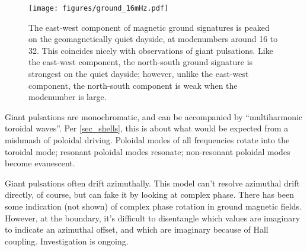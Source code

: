 \begin{figure}[H]
    \centering
    \texttt{[image: figures/ground\_16mHz.pdf]}
    \caption[Dayside Ground Magnetic Fields]{
      The east-west component of magnetic ground signatures is peaked on the geomagnetically quiet dayside, at modenumbers around 16 to 32. This coincides nicely with observations of giant pulsations. Like the east-west component, the north-south ground signature is strongest on the quiet dayside; however, unlike the east-west component, the north-south component is weak when the modenumber is large. 
    }
    \label{fig_ground_signatures}
\end{figure}

Giant pulsations are monochromatic, and can be accompanied by ``multiharmonic toroidal waves''\cite{takahashi_2011}. Per \cref{sec_shells}, this is about what would be expected from a mishmash of poloidal driving. Poloidal modes of all frequencies rotate into the toroidal mode; resonant poloidal modes resonate; non-resonant poloidal modes become evanescent. 

Giant pulsations often drift azimuthally. This model can't resolve azimuthal drift directly, of course, but can fake it by looking at complex phase. There has been some indication (not shown) of complex phase rotation in ground magnetic fields. However, at the boundary, it's difficult to disentangle which values are imaginary to indicate an azimuthal offset, and which are imaginary because of Hall coupling. Investigation is ongoing. 












